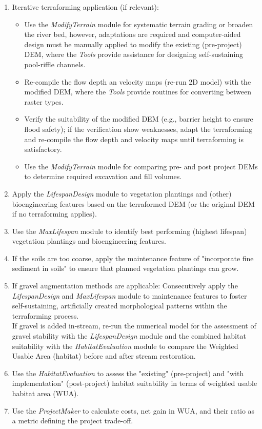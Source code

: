 \begin{enumerate}
	\item Iterative terraforming application (if relevant):
	\begin{itemize}
	  \item Use the \textit{ModifyTerrain} module for systematic terrain grading or broaden the river bed, however, adaptations are required and computer-aided design must be manually applied to modify the existing (pre-project) DEM, where the \textit{Tools} provide assistance for designing self-sustaining pool-riffle channels.
	  \item Re-compile the flow depth an velocity maps (re-run 2D model) with the modified DEM, where the \textit{Tools} provide routines for converting between raster types.
	  \item Verify the suitability of the modified DEM (e.g., barrier height to ensure flood safety); if the verification show weaknesses, adapt the terraforming and re-compile the flow depth and velocity maps until terraforming is satisfactory.
	  \item Use the \textit{ModifyTerrain} module for comparing pre- and post project DEMs to determine required excavation and fill volumes.
	\end{itemize}	
	\item Apply the \textit{LifespanDesign} module to vegetation plantings and (other) bioengineering features based on the terraformed DEM (or the original DEM if no terraforming applies).
	\item Use the \textit{MaxLifespan} module to identify best performing (highest lifespan) vegetation plantings and bioengineering features.
	\item If the soils are too coarse, apply the maintenance feature of "incorporate fine sediment in soils" to ensure that planned vegetation plantings can grow.
	\item If gravel augmentation methods are applicable: Consecutively apply the \textit{LifespanDesign} and \textit{MaxLifespan} module to maintenance features to foster self-sustaining, artificially created morphological patterns within the terraforming process.\\
	If gravel is added in-stream, re-run the numerical model for the assessment of gravel stability with the \textit{LifespanDesign} module and the combined habitat suitability with the \textit{HabitatEvaluation} module to compare the Weighted Usable Area (habitat) before and after stream restoration.
	\item Use the \textit{HabitatEvaluation} to assess the "existing" (pre-project) and "with implementation" (post-project) habitat suitability in terms of weighted usable habitat area (WUA).
	\item Use the \textit{ProjectMaker} to calculate costs, net gain in WUA, and their ratio as a metric defining the project trade-off.
\end{enumerate}

